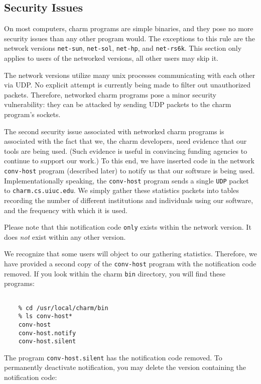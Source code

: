 \subsection{Security Issues}

On most computers, charm programs are simple binaries, and they pose
no more security issues than any other program would.  The exceptions
to this rule are the network versions {\tt net-sun}, {\tt net-sol},
{\tt net-hp}, and {\tt net-rs6k}.  This section only applies to users
of the networked versions, all other users may skip it.

The network versions utilize many unix processes communicating with
each other via UDP.  No explicit attempt is currently being made to
filter out unauthorized packets.  Therefore, networked charm programs
pose a minor security vulnerability: they can be attacked by sending
UDP packets to the charm program's sockets.

The second security issue associated with networked charm programs is
associated with the fact that we, the charm developers, need evidence
that our tools are being used.  (Such evidence is useful in convincing
funding agencies to continue to support our work.)  To this end, we
have inserted code in the network {\tt conv-host} program (described
later) to notify us that our software is being used.
Implementationally speaking, the {\tt conv-host} program sends a
single {\tt UDP} packet to {\tt charm.cs.uiuc.edu}.  We simply gather
these statistics packets into tables recording the number of different
institutions and individuals using our software, and the frequency
with which it is used.

Please note that this notification code {\tt only} exists within the
network version.  It does {\em not} exist within any other version.

We recognize that some users will object to our gathering statistics.
Therefore, we have provided a second copy of the {\tt conv-host}
program with the notification code removed.  If you look within the
charm {\tt bin} directory, you will find these programs:

\begin{verbatim}

    % cd /usr/local/charm/bin
    % ls conv-host*
    conv-host
    conv-host.notify
    conv-host.silent

\end{verbatim}

The program {\tt conv-host.silent} has the notification code removed.  To
permanently deactivate notification, you may delete the version containing
the notification code:

